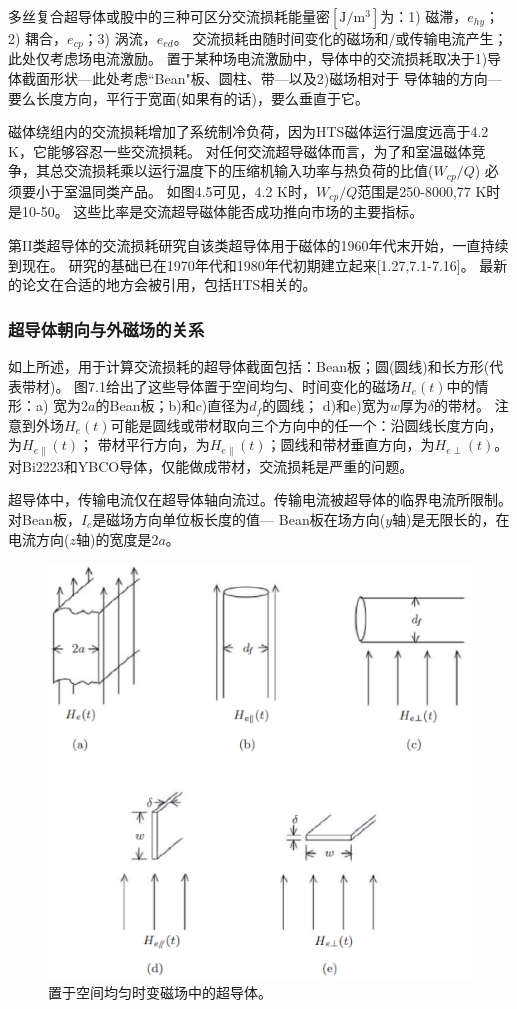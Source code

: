 多丝复合超导体或股中的三种可区分交流损耗能量密$[\mathrm{J/m^3}]$为：1) 磁滞，$e_{hy}$；
2) 耦合，$e_{cp}$；3) 涡流，$e_{ed}$。
交流损耗由随时间变化的磁场和/或传输电流产生；此处仅考虑场电流激励。
置于某种场电流激励中，导体中的交流损耗取决于1)导体截面形状---此处考虑``Bean"板、圆柱、带---以及2)磁场相对于
导体轴的方向---要么长度方向，平行于宽面(如果有的话)，要么垂直于它。

磁体绕组内的交流损耗增加了系统制冷负荷，因为HTS磁体运行温度远高于4.2 K，它能够容忍一些交流损耗。
对任何交流超导磁体而言，为了和室温磁体竞争，其总交流损耗乘以运行温度下的压缩机输入功率与热负荷的比值($W_{cp}/Q$)
必须要小于室温同类产品。
如图4.5可见，4.2 K时，$W_{cp}/Q$范围是250-8000,77 K时是10-50。
这些比率是交流超导磁体能否成功推向市场的主要指标。

第II类超导体的交流损耗研究自该类超导体用于磁体的1960年代末开始，一直持续到现在。
研究的基础已在1970年代和1980年代初期建立起来[1.27,7.1-7.16]。
最新的论文在合适的地方会被引用，包括HTS相关的。

\subsubsection*{超导体朝向与外磁场的关系}
如上所述，用于计算交流损耗的超导体截面包括：Bean板；圆(圆线)和长方形(代表带材)。
图7.1给出了这些导体置于空间均匀、时间变化的磁场$H_e(t)$中的情形：a) 宽为$2a$的Bean板；b)和c)直径为$d_f$的圆线；
d)和e)宽为$w$厚为$\delta$的带材。
注意到外场$H_e(t)$可能是圆线或带材取向三个方向中的任一个：沿圆线长度方向，为$H_{e\parallel}(t)$；
带材平行方向，为$H_{e\parallel}(t)$；圆线和带材垂直方向，为$H_{e\perp}(t)$。
对Bi2223和YBCO导体，仅能做成带材，交流损耗是严重的问题。

超导体中，传输电流仅在超导体轴向流过。传输电流被超导体的临界电流所限制。对Bean板，$I_c$是磁场方向单位板长度的值---
Bean板在场方向($y$轴)是无限长的，在电流方向($z$轴)的宽度是$2a$。
\begin{figure}[htbp]
	\centering
	\includegraphics[scale=0.6]{chpt7/figs/fig7.1.eps}
	\caption{置于空间均匀时变磁场中的超导体。}
\end{figure}


